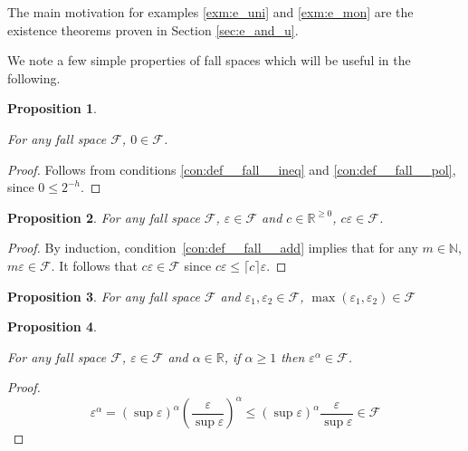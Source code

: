 \documentclass[11pt]{article}
\numberwithin{equation}{section}
\theoremstyle{definition}
\theoremstyle{plain}
\newtheorem{proposition}{Proposition}[section]
\newcommand{\Nats}{\mathbb{N}}
\newcommand{\Reals}{\mathbb{R}}
\newcommand{\Ceil}[1]{\lceil #1 \rceil}
\newcommand{\Fall}{\mathcal{F}}
\begin{document}
The main motivation for examples \ref{exm:e_uni} and \ref{exm:e_mon} are the existence theorems proven in Section \ref{sec:e_and_u}.

We note a few simple properties of fall spaces which will be useful in the following.

\begin{proposition}
\label{prp:err_spc_zero}

For any fall space $\Fall$, $0 \in \Fall$.

\end{proposition}

\begin{proof}

Follows from conditions \ref{con:def__fall__ineq} and \ref{con:def__fall__pol}, since $0 \leq 2^{-h}$.
\end{proof}

\begin{proposition}

For any fall space $\Fall$, $\varepsilon \in \Fall$ and $c \in \Reals^{\geq 0}$, $c \varepsilon \in \Fall$.

\end{proposition}

\begin{proof}

By induction, condition~\ref{con:def__fall__add} implies that for any $m \in \Nats$, $m\varepsilon \in \Fall$. It follows that $c\varepsilon \in \Fall$ since $c\varepsilon \leq \Ceil{c}\varepsilon$.
\end{proof}

\begin{proposition}

For any fall space $\Fall$ and $\varepsilon_1, \varepsilon_2 \in \Fall$, $\max(\varepsilon_1,\varepsilon_2) \in \Fall$

\end{proposition}


\begin{proposition}
\label{prp:fall_space_closed_wrt_power}

For any fall space $\Fall$, $\varepsilon \in \Fall$ and $\alpha \in \Reals$, if $\alpha \geq 1$ then $\varepsilon^\alpha \in \Fall$.

\end{proposition}

\begin{proof}

$$\varepsilon^\alpha = (\sup \varepsilon)^\alpha \left(\frac{\varepsilon}{\sup \varepsilon}\right)^\alpha \leq  (\sup \varepsilon)^\alpha \frac{\varepsilon}{\sup \varepsilon} \in \Fall$$
\end{proof}
\end{document}
